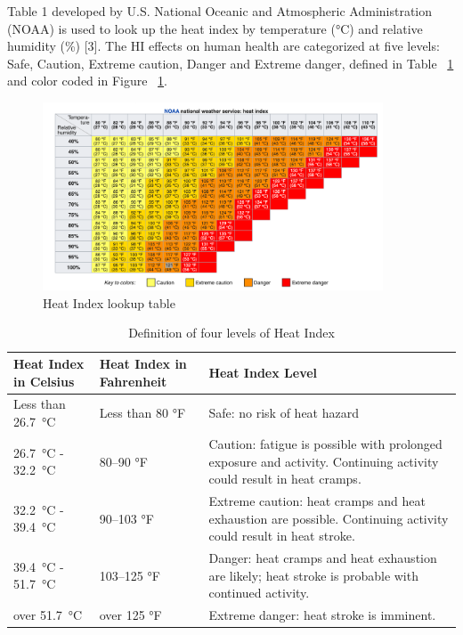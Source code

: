 Table 1 developed by U.S. National Oceanic and Atmospheric Administration (NOAA) is used to look up the heat index by temperature (\si{\celsius}) and relative humidity (\%) [3]. The HI effects on human health are categorized at five levels: Safe, Caution, Extreme caution, Danger and Extreme danger, defined in Table ~\ref{table:heat-index-chart} and color coded in Figure ~\ref{fig:heat-index-lookup-table}.

\begin{figure}[hbtp] 
\centering
\includegraphics[width=0.9\textwidth, height=0.9\textheight, keepaspectratio=true]{media/heat_index_chart.png}
\caption{Heat Index lookup table \protect \label{fig:heat-index-lookup-table}}
\end{figure}

\begin{table}
\centering
\caption{Definition of four levels of Heat Index \label{table:heat-index-chart}} \tabularnewline
\begin{tabular}{ |p{1in}|p{1in}|p{2in}|  }
\hline
    \textbf{Heat Index in Celsius} & \textbf{Heat Index in Fahrenheit} & \textbf{Heat Index Level} \\ \hline 
    Less than \SI{26.7}{\celsius} & Less than 80 °F & Safe: no risk of heat hazard \\ \hline
    \SI{26.7}{\celsius} - \SI{32.2}{\celsius} & 80–90 °F & Caution: fatigue is possible with prolonged exposure and activity. Continuing activity could result in heat cramps. \\ \hline
    \SI{32.2}{\celsius} - \SI{39.4}{\celsius}& 90–103 °F & Extreme caution: heat cramps and heat exhaustion are possible. Continuing activity could result in heat stroke. \\ \hline
    \SI{39.4}{\celsius} - \SI{51.7}{\celsius} & 103–125 °F & Danger: heat cramps and heat exhaustion are likely; heat stroke is probable with continued activity. \\ \hline
    over \SI{51.7}{\celsius} & over 125 °F & Extreme danger: heat stroke is imminent. \\ \hline
\end{tabular}
\end{table}


